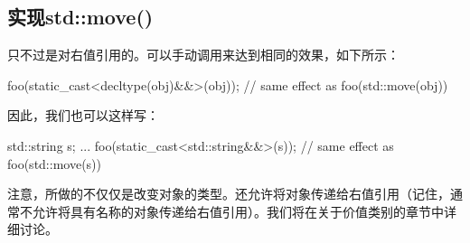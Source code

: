 \subsection{实现std::move()}

只不过是对右值引用的。可以手动调用来达到相同的效果，如下所示：

\begin{cppcode}
foo(static_cast<decltype(obj)&&>(obj)); // same effect as foo(std::move(obj))
\end{cppcode}

因此，我们也可以这样写：

\begin{cppcode}
std::string s;
...
foo(static_cast<std::string&&>(s)); // same effect as foo(std::move(s))
\end{cppcode}

注意，所做的不仅仅是改变对象的类型。还允许将对象传递给右值引用（记住，通常不允许将具有名称的对象传递给右值引用）。我们将在关于价值类别的章节中详细讨论。





























